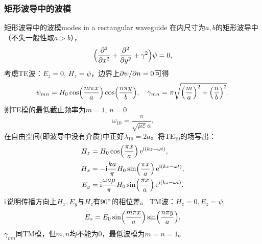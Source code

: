 \subsubsection{矩形波导中的波模}
\begin{example}{矩形波导中的波模}{modes in a rectangular waveguide}
    在内尺寸为$a,b$的矩形波导中（不失一般性取$a>b$），
    \[
        \Bigkh{\pp[2]x+\pp[2]y+\gamma^2}\psi=0,
    \]
    考虑TE波：$E_z=0,\,H_z=\psi$，边界上$\p\psi/\p n=0$可得
    \[
        \psi_{mn}=H_0\cos\Bigkh{\frac{m\pi x}a}\cos\Bigkh{\frac{n\pi y}b},\quad\gamma_{mn}=\pi\sqrt{\Bigkh{\frac ma}^2+\Bigkh{\frac nb}^2}.
    \]
    则TE模的最低截止频率为$m=1,\,n=0$
    \[
        \omega_{10}=\frac\pi{\sqrt{\mu\varepsilon}a}.
    \]
    在自由空间(即波导中没有介质)中正好$\lambda_{10}=2a$。将TE$_{10}$的场写出：
    \begin{align*}
        H_z&=H_0\cos\Bigkh{\frac{\pi x}a}\e{\i(kz-\omega t)},\\
        H_x&=-\i\frac{ka}\pi H_0\sin\Bigkh{\frac{\pi x}a}\e{\i(kz-\omega t)},\\
        E_y&=\i\frac{\omega a\mu}\pi H_0\sin\Bigkh{\frac{\pi x}a}\e{\i(kz-\omega t)}.
    \end{align*}
    $\i$说明传播方向上$H_x,E_y$与$H_z$有$90\degree$的相位差。
    \tcblower
    TM波：$H_z=0,E_z=\psi,$
    \[
        E_z=E_0\sin\Bigkh{\frac{m\pi x}a}\sin\Bigkh{\frac{n\pi y}a},
    \]
    $\gamma_{mn}$同TM模，但$m,n$均不能为0，最低波模为$m=n=1$。
\end{example}
